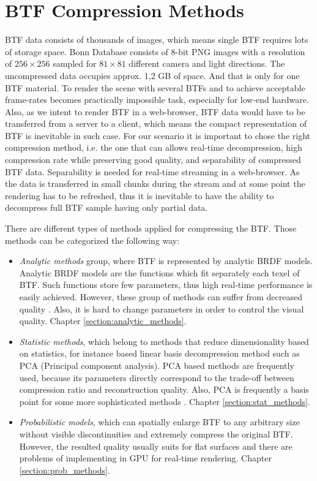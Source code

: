 \chapter{BTF Compression Methods}
\label{chapter:compression_methods}



 BTF data consists of thousands of images, which means single BTF requires lots of storage space.
Bonn  Database \cite{btfBonn} consists of 8-bit PNG images with a resolution of $256\times256$ sampled for $81\times81$ different camera and light directions.
 The uncompressed data occupies approx. 1,2 GB of space. And that is only for one BTF material.
 To render the scene with several BTFs and to achieve acceptable frame-rates becomes practically impossible task, especially for low-end hardware.
 Also, as we intent to render BTF in a web-browser, BTF data would have to be transferred from a server to a client, which means the compact representation of BTF is inevitable in such case.
 For our scenario it is important to chose the right compression method, i.e. the one that can allows real-time decompression, high compression rate while preserving good quality, and separability of compressed BTF data.
 Separability is needed for real-time streaming in a web-browser.  
 As the data is transferred in small chunks during the stream and at some point the rendering has to be refreshed, thus it is inevitable to have the ability to decompress full BTF sample having only partial data.

There are different types of methods applied for compressing the BTF. Those methods can be categorized the following way:

\begin{itemize}
  \item \emph{Analytic methods} group, where BTF is represented by analytic BRDF models. 
Analytic BRDF models are the functions which fit separately each texel of BTF. Such functions store few parameters, thus high real-time performance is easily achieved.
However, these group of methods can suffer from decreased quality \cite{haindl}. Also, it is hard to change parameters in order to control the visual quality. Chapter  \ref{section:analytic_methods}.
   \item \emph{Statistic methods}, which belong to methods that reduce dimensionality based on  statistics, for instance based linear basis decompression method such as PCA (Principal component analysis). 
    PCA based methods are frequently used, because its parameters directly correspond to the trade-off between compression ratio and reconstruction quality.
    Also, PCA is frequently a basis point for some more sophisticated methods \cite{webglbtfstreaming}. Chapter \ref{section:stat_methods}.
   \item \emph{Probabilistic models}, which can spatially enlarge BTF to any arbitrary size without visible discontinuities and extremely compress the original BTF.
   However, the resulted quality usually suits for flat surfaces and there are problems of implementing in GPU for real-time rendering. Chapter \ref{section:prob_methods}.
 \end{itemize}



